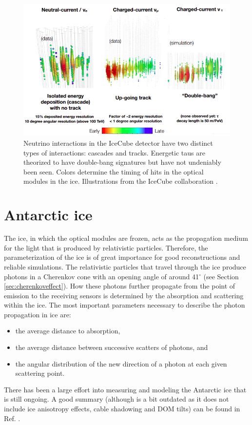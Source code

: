 \begin{figure}
\centering
\includegraphics[width=\textwidth]{chapter4/img/ICinteractions2.png}
\caption{Neutrino interactions in the IceCube detector have two distinct types of interactions: cascades and tracks. Energetic taus are theorized to have double-bang signatures but have not undeniably been seen. Colors determine the timing of hits in the optical modules in the ice. Illustrations from the IceCube collaboration \cite{kjeroSignatures}.}
\label{fig:ICinteractions2}
\end{figure}



\section{Antarctic ice}
\label{sec:ice}
The ice, in which the optical modules are frozen, acts as the propagation medium for the light that is produced by relativistic particles. Therefore, the parameterization of the ice is of great importance for good reconstructions and reliable simulations. The relativistic particles that travel through the ice produce photons in a Cherenkov cone with an opening angle of around 41$^\circ$ (see Section \ref{sec:cherenkoveffect}). How these photons further propagate from the point of emission to the receiving sensors is determined by the absorption and scattering within the ice. The most important parameters necessary to describe the photon propagation in ice are:
\vspace{2mm}
\begin{itemize}
\item the average distance to absorption,
\item the average distance between successive scatters of photons, and 
\item the angular distribution of the new direction of a photon at each given scattering point.
\end{itemize}
\vspace{2mm}
There has been a large effort into measuring and modeling the Antarctic ice that is still ongoing. A good summary (although is a bit outdated as it does not include ice anisotropy effects, cable shadowing and DOM tilts) can be found in Ref. \cite{Aartsen:2013rt}.

